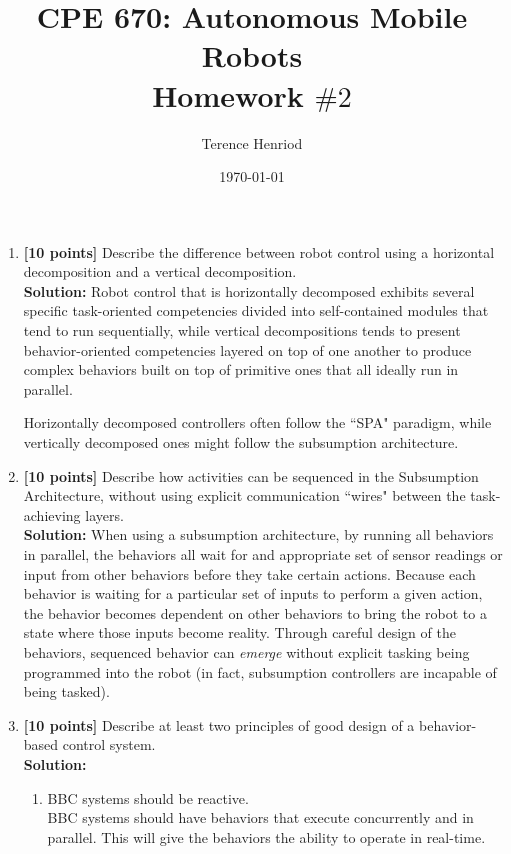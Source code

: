 \documentclass{article}
\title{CPE 670: Autonomous Mobile Robots \\ Homework $\#2$}
\author{Terence Henriod}
\date{\today}
\begin{document}
\maketitle

\newpage
\begin{enumerate}
\item \textbf{[10 points]} Describe the difference between robot control using a horizontal decomposition and a vertical decomposition.\\

\textbf{Solution:} Robot control that is horizontally decomposed exhibits several specific task-oriented competencies divided into self-contained modules that tend to run sequentially, while vertical decompositions tends to present behavior-oriented competencies layered on top of one another to produce complex behaviors built on top of primitive ones that all ideally run in parallel.

Horizontally decomposed controllers often follow the ``SPA" paradigm, while vertically decomposed ones might follow the subsumption architecture.
\newline

\item \textbf{[10 points]} Describe how activities can be sequenced in the Subsumption Architecture, without using explicit communication ``wires" between the task-achieving layers.\\

\textbf{Solution:} When using a subsumption architecture, by running all behaviors in parallel, the behaviors all wait for and appropriate set of sensor readings or input from other behaviors before they take certain actions. Because each behavior is waiting for a particular set of inputs to perform a given action, the behavior becomes dependent on other behaviors to bring the robot to a state where those inputs become reality. Through careful design of the behaviors, sequenced behavior can \emph{emerge} without explicit tasking being programmed into the robot (in fact, subsumption controllers are incapable of being tasked).
\newline

\item \textbf{[10 points]} Describe at least two principles of good design of a behavior-based control system.\\

\textbf{Solution:}
    \begin{enumerate}
        \item{BBC systems should be reactive.}\\
        BBC systems should have behaviors that execute concurrently and in parallel. This will give the behaviors the ability to operate in real-time.
        \newline


\end{enumerate}
\end{enumerate}
\end{document}
